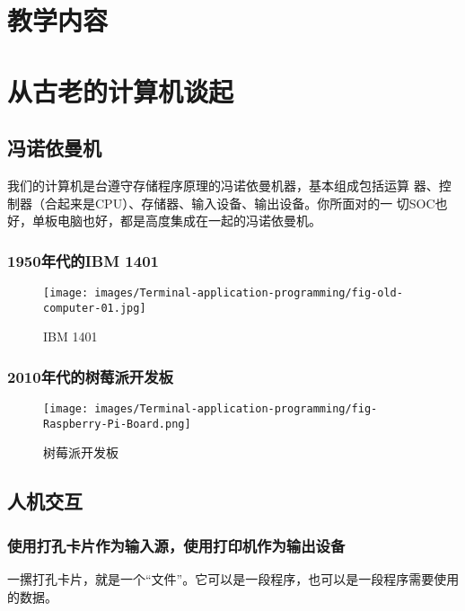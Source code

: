 \newpage
\section*{教学内容}
\sline

\section{从古老的计算机谈起}

\subsection{冯诺依曼机}

我们的计算机是台遵守存储程序原理的冯诺依曼机器，基本组成包括{\hei 运算
  器、控制器（合起来是CPU）、存储器、输入设备、输出设备}。你所面对的一
切SOC也好，单板电脑也好，都是高度集成在一起的冯诺依曼机。

\subsubsection{1950年代的IBM 1401}

\begin{figure}[htb]
\centering
\texttt{[image: images/Terminal-application-programming/fig-old-computer-01.jpg]}
\caption{IBM 1401}
\label{fig:old-computer-01.jpg}
\end{figure}

\subsubsection{2010年代的树莓派开发板}

\begin{figure}[htb]
\centering
\texttt{[image: images/Terminal-application-programming/fig-Raspberry-Pi-Board.png]}
\caption{树莓派开发板}
\label{fig:Raspberry-Pi-Board}
\end{figure}


\subsection{人机交互}

\subsubsection{使用打孔卡片作为输入源，使用打印机作为输出设备}

一摞打孔卡片，就是一个“文件”。它可以是一段程序，也可以是一段程序需要使用的数据。


